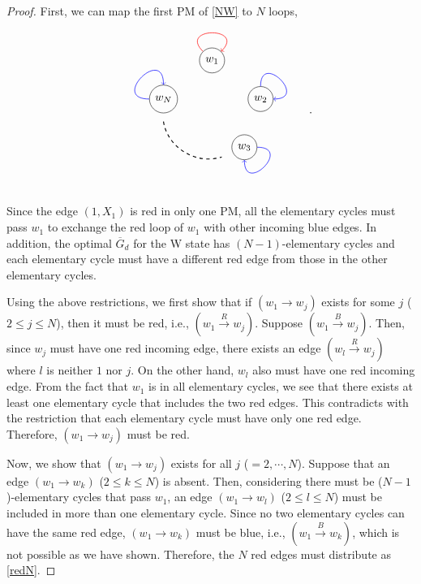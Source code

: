 \documentclass[a4paper,twocolumn,8pt,accepted=2021-12-15]{quantumarticle}
\def\dc{{\overline{G}_d }}
\begin{document}
	\begin{proof}
		First, we can map the first PM of \eqref{NW} to $N$ loops,
		\begin{align}\label{wstate_loops}
			\begin{tikzpicture}[baseline={([yshift=-.5ex]current bounding box.center)}]
				\node[circle,draw] (a) at (6,2.7) {$w_1$};
				\node[circle,draw] (b) at (7.5,1.5) {$w_2$};		
				\node[circle,draw] (c) at (7,0) {$w_3$};
				\node[circle,draw] (e) at (4.5,1.5) {$w_N$};		
				\path[every loop/.style={min distance=10mm,in=45,out=135,looseness=5,color=red,->},line width = 0.5pt] (a) edge [loop above]   (a);
				\path[every loop/.style={min distance=10mm,in=0,out=90,looseness=5,color=blue},line width = 0.5pt,->] (b) edge [loop above] (b);
				\path[every loop/.style={min distance=10mm,in=270,out=0,looseness=5,color=blue ,->},line width = 0.5pt] (c) edge [loop above]  (c);
				\path[every loop/.style={min distance=10mm,in=90,out=180,looseness=5,color=blue ,->},line width = 0.5pt] (e) edge [loop above]  (e);	
				\draw[thick, dashed] (4.5,0.8) to[bend right=50] (6.3,-.3);		 	
			\end{tikzpicture}.
		\end{align}		
		Since the edge $(1,X_1)$ is red in only one PM, all the elementary cycles must pass $w_1$ to exchange the red loop of $w_1$ with other incoming blue edges. 
		In addition, the optimal $\dc$ for the W state has $(N-1)$-elementary cycles and each elementary cycle must have a different red edge from those in the other elementary cycles. 
		
		Using the above restrictions, we first show that if $(w_1\to w_j)$  exists for some $j$ ($2\le j \le N$), then it must be red, i.e., $(w_1\xrightarrow{R}w_j)$. Suppose  $(w_1 \xrightarrow{B} w_j)$. Then, since $w_j$ must have one red incoming edge, there exists an edge $(w_l\xrightarrow{R}w_j)$ where $l$ is neither $1$ nor $j$.
		On the other hand, $w_l$ also must have one red incoming edge. From the fact that $w_1$ is in all elementary cycles, we see that there exists at least one elementary cycle that includes the two red edges.  This contradicts with the restriction that each elementary cycle must have only one red edge. Therefore, $(w_1\to w_j)$ must be red.
		
		Now, we show that 
		$(w_1\to w_j)$ exists for all $j$ ($=2,\cdots,N$).  Suppose that an edge $(w_1\to w_k)$ ($2\le k \le N$) is absent. Then, considering there must be ($N-1$)-elementary cycles that pass $w_1$, an edge $(w_1 \to w_l)$ ($2\le l\le N$) must be included in more than one elementary cycle. Since no two elementary cycles can have the same red edge, $(w_1 \to w_k)$ must be blue, i.e., $(w_1 \xrightarrow{B} w_k)$, which is not possible as we have shown. Therefore, the $N$ red edges must distribute as \eqref{redN}. 
	\end{proof}
\end{document}
